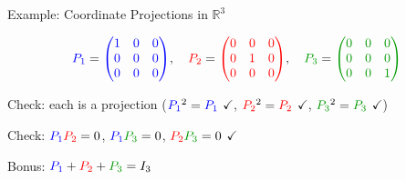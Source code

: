 \documentclass[10pt]{beamer}
\theoremstyle{definition}
\newcommand{\gn}[1]{{\color{green!60!black}#1}}       %
\newcommand{\rd}[1]{{\color{red}#1}}                  %
\newcommand{\bl}[1]{{\color{blue}#1}}                 %
\begin{document}
\begin{frame}{Example: Coordinate Projections in $\mathbb{R}^3$}

$$\bl{P_1} = \bl{\begin{pmatrix} 1 & 0 & 0 \\ 0 & 0 & 0 \\ 0 & 0 & 0 \end{pmatrix}}, \quad \rd{P_2} = \rd{\begin{pmatrix} 0 & 0 & 0 \\ 0 & 1 & 0 \\ 0 & 0 & 0 \end{pmatrix}}, \quad \gn{P_3} = \gn{\begin{pmatrix} 0 & 0 & 0 \\ 0 & 0 & 0 \\ 0 & 0 & 1 \end{pmatrix}}$$

\vspace{0.5em}

Check: each is a projection ($\bl{P_1}^2 = \bl{P_1}$ $\checkmark$, \; $\rd{P_2}^2 = \rd{P_2}$ $\checkmark$, \; $\gn{P_3}^2 = \gn{P_3}$ $\checkmark$)

\vspace{0.5em}

Check: $\bl{P_1}\rd{P_2} = 0$, \; $\bl{P_1}\gn{P_3} = 0$, \; $\rd{P_2}\gn{P_3} = 0$ $\checkmark$

\vspace{0.5em}

Bonus: $\bl{P_1} + \rd{P_2} + \gn{P_3} = I_3$

\end{frame}
\end{document}
